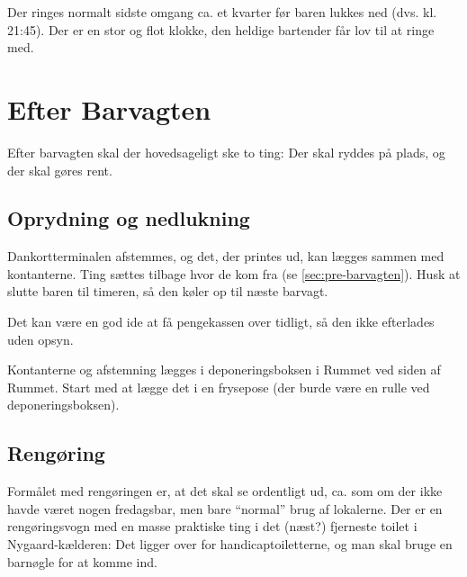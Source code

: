 Der ringes normalt sidste omgang ca. et kvarter før baren lukkes ned
(dvs. kl. 21:45). Der er en stor og flot klokke, den heldige bartender
får lov til at ringe med.

\section{Efter Barvagten}
\label{sec:post-barvagten}

Efter barvagten skal der hovedsageligt ske to ting: Der skal ryddes på
plads, og der skal gøres rent.

\subsection{Oprydning og nedlukning}
\label{sec:post:oprydning}

Dankortterminalen afstemmes, og det, der printes ud, kan lægges sammen
med kontanterne. Ting sættes tilbage hvor de kom fra (se
\autoref{sec:pre-barvagten}). Husk at slutte baren til timeren, så den
køler op til næste barvagt.

 Det kan være en god ide at få
pengekassen over tidligt, så den ikke efterlades uden opsyn.

Kontanterne og afstemning lægges i deponeringsboksen i Rummet ved
siden af Rummet. Start med at lægge det i en frysepose (der burde være
en rulle ved deponeringsboksen).

\subsection{Rengøring}
\label{sec:post:rengoring}

Formålet med rengøringen er, at det skal se ordentligt ud, ca. som om
der ikke havde været nogen fredagsbar, men bare ``normal'' brug af
lokalerne. Der er en rengøringsvogn med en masse praktiske ting i det
(næst?) fjerneste toilet i Nygaard-kælderen: Det ligger over for
handicaptoiletterne, og man skal bruge en barnøgle for at komme ind.

